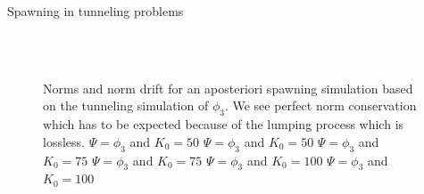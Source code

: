 \begin{chapter}{Spawning in tunneling problems}
\begin{figure}[h!]
{  } \\
   \\
  \caption[Norms and norm drift for an aposteriori spawning simulation with lumping]{
  Norms and norm drift for an aposteriori spawning simulation based on the tunneling
  simulation of $\phi_3$. We see perfect norm conservation which has to be expected
  because of the lumping process which is lossless.
   $\Psi = \phi_3$ and $K_0=50$
   $\Psi = \phi_3$ and $K_0=50$
   $\Psi = \phi_3$ and $K_0=75$
   $\Psi = \phi_3$ and $K_0=75$
   $\Psi = \phi_3$ and $K_0=100$
   $\Psi = \phi_3$ and $K_0=100$
  \label{fig:spawn_eckart_apost_phi3_norms}
  }
\end{figure}



\end{chapter}
